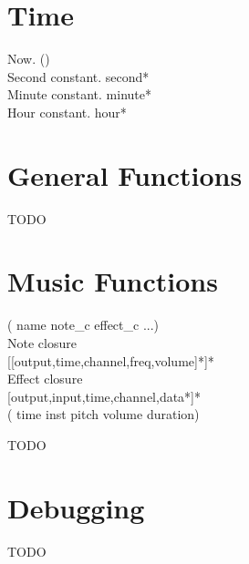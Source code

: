 \documentclass[10pt, twoside]{article}   	%
\begin{document}
\begin{multicols}{3}
\section*{Time}
Now.	\hfill() \\
Second constant.	\hfill*second* \\
Minute constant.	\hfill*minute* \\
Hour constant.	\hfill*hour*


\section*{General Functions}
TODO

\section*{Music Functions}
 \hfill
( name note\_c effect\_c ...) \\
Note closure \\
\null\hfill[[output,time,channel,freq,volume]*]* \\
Effect closure \\  
\null\hfill[output,input,time,channel,data*]* \\
\hphantom{.}\hfill( time inst pitch volume duration)\par
TODO

\section*{Debugging}
TODO


\end{multicols}
\end{document}
